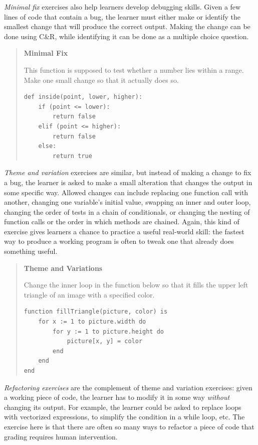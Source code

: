 \emph{Minimal fix} exercises also help learners develop debugging skills.
Given a few lines of code that contain a bug, the learner must either
make or identify the smallest change that will produce the correct
output. Making the change can be done using C\&R, while identifying it
can be done as a multiple choice question.

\begin{quote}\setlength{\parindent}{0pt}
\textbf{Minimal Fix}

This function is supposed to test whether a number lies within a
range. Make one small change so that it actually does so.

\begin{lstlisting}
def inside(point, lower, higher):
    if (point <= lower):
        return false
    elif (point <= higher):
        return false
    else:
        return true
\end{lstlisting}
\end{quote}

\emph{Theme and variation} exercises are similar, but instead of making a
change to fix a bug, the learner is asked to make a small alteration
that changes the output in some specific way. Allowed changes can
include replacing one function call with another, changing one
variable's initial value, swapping an inner and outer loop, changing
the order of tests in a chain of conditionals, or changing the nesting
of function calls or the order in which methods are chained. Again, this
kind of exercise gives learners a chance to practice a useful real-world
skill: the fastest way to produce a working program is often to tweak
one that already does something useful.

\begin{quote}\setlength{\parindent}{0pt}
\textbf{Theme and Variations}

Change the inner loop in the function below so that it fills the upper
left triangle of an image with a specified color.

\begin{lstlisting}
function fillTriangle(picture, color) is
    for x := 1 to picture.width do
        for y := 1 to picture.height do
            picture[x, y] = color
        end
    end
end
\end{lstlisting}
\end{quote}

\emph{Refactoring exercises} are the complement of theme and variation
exercises: given a working piece of code, the learner has to modify it
in some way \emph{without} changing its output. For example, the learner
could be asked to replace loops with vectorized expressions, to simplify
the condition in a while loop, etc. The exercise here is that there are
often so many ways to refactor a piece of code that grading requires
human intervention.

